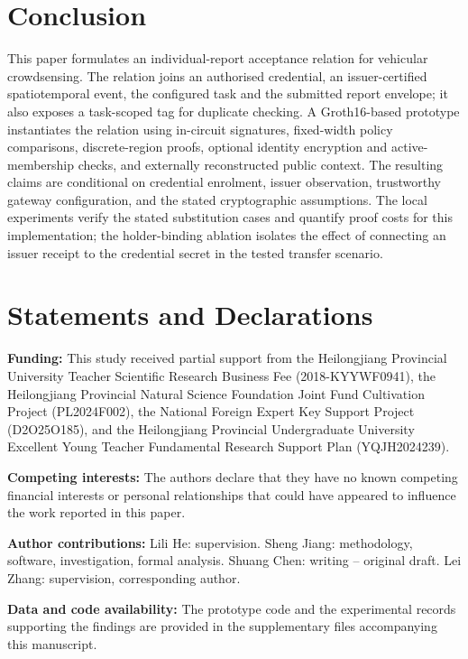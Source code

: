 \documentclass[pdflatex,iicol,sn-mathphys-num]{sn-jnl}
\begin{document}
\section{Conclusion}
This paper formulates an individual-report acceptance relation for vehicular crowdsensing. The relation joins an authorised credential, an issuer-certified spatiotemporal event, the configured task and the submitted report envelope; it also exposes a task-scoped tag for duplicate checking. A Groth16-based prototype instantiates the relation using in-circuit signatures, fixed-width policy comparisons, discrete-region proofs, optional identity encryption and active-membership checks, and externally reconstructed public context. The resulting claims are conditional on credential enrolment, issuer observation, trustworthy gateway configuration, and the stated cryptographic assumptions. The local experiments verify the stated substitution cases and quantify proof costs for this implementation; the holder-binding ablation isolates the effect of connecting an issuer receipt to the credential secret in the tested transfer scenario.



\section*{Statements and Declarations}
\noindent\textbf{Funding:} This study received partial support from the Heilongjiang Provincial University Teacher Scientific Research Business Fee (2018-KYYWF0941), the Heilongjiang Provincial Natural Science Foundation Joint Fund Cultivation Project (PL2024F002), the National Foreign Expert Key Support Project (D2O25O185), and the Heilongjiang Provincial Undergraduate University Excellent Young Teacher Fundamental Research Support Plan (YQJH2024239).

\noindent\textbf{Competing interests:} The authors declare that they have no known competing financial interests or personal relationships that could have appeared to influence the work reported in this paper.

\noindent\textbf{Author contributions:} Lili He: supervision. Sheng Jiang: methodology, software, investigation, formal analysis. Shuang Chen: writing -- original draft. Lei Zhang: supervision, corresponding author.

\noindent\textbf{Data and code availability:} The prototype code and the experimental records supporting the findings are provided in the supplementary files accompanying this manuscript.
\end{document}
